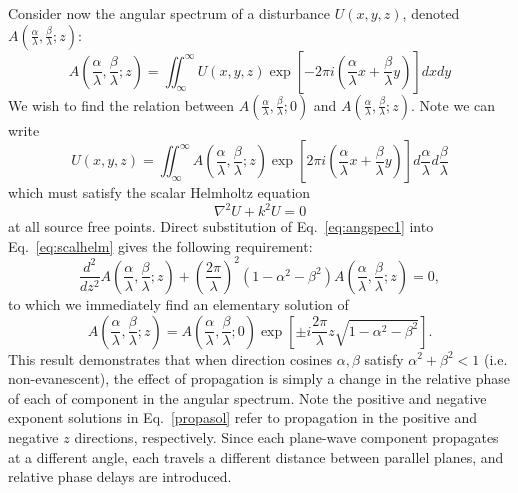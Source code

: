 \documentclass[12pt,a4paper]{article}
\begin{document}
Consider now the angular spectrum of a disturbance \(U(x,y,z)\), denoted \(A\left(\frac{\alpha}{\lambda},\frac{\beta}{\lambda};z\right)\):
\begin{displaymath}
	A\!\left(\frac{\alpha}{\lambda},\frac{\beta}{\lambda};z\right)=\iint_{\infty}^{\infty}U\!\left(x,y,z\right)\exp\left[-2\pi i\left(\frac{\alpha}{\lambda}x+\frac{\beta}{\lambda}y\right)\right]dxdy
\end{displaymath}
We wish to find the relation between \(A\left(\frac{\alpha}{\lambda},\frac{\beta}{\lambda};0\right)\) and \(A\left(\frac{\alpha}{\lambda},\frac{\beta}{\lambda};z\right)\). Note we can write
\begin{equation}
	\label{eq:angspec1}
	U\!\left(x,y,z\right)=\iint_{\infty}^{\infty}A\!\left(\frac{\alpha}{\lambda},\frac{\beta}{\lambda};z\right)\exp\left[2\pi i\left(\frac{\alpha}{\lambda}x+\frac{\beta}{\lambda}y\right)\right]d\frac{\alpha}{\lambda}d\frac{\beta}{\lambda}
\end{equation}
which must satisfy the scalar Helmholtz equation
\begin{equation}
	\label{eq:scalhelm}
	\nabla^{2}U+k^{2}U=0
\end{equation}
at all source free points. Direct substitution of Eq.~\eqref{eq:angspec1} into Eq.~\eqref{eq:scalhelm} gives the following requirement:
\begin{displaymath}
	\frac{d^{2}}{dz^{2}}A\!\left(\frac{\alpha}{\lambda},\frac{\beta}{\lambda};z\right)+\left(\frac{2\pi}{\lambda}\right)^{2}\left(1-\alpha^{2}-\beta^{2}\right)A\!\left(\frac{\alpha}{\lambda},\frac{\beta}{\lambda};z\right)=0,
\end{displaymath}
to which we immediately find an elementary solution of
\begin{equation}
	\label{propasol}
	A\!\left(\frac{\alpha}{\lambda},\frac{\beta}{\lambda};z\right)=A\!\left(\frac{\alpha}{\lambda},\frac{\beta}{\lambda};0\right)\exp\left[\pm i\frac{2\pi}{\lambda}z\sqrt{1-\alpha^{2}-\beta^{2}}\right].
\end{equation}
This result demonstrates that when direction cosines \(\alpha,\beta\) satisfy \(\alpha^{2}+\beta^{2}<1\) (i.e. non-evanescent), the effect of propagation is simply a change in the relative phase of each of component in the angular spectrum. Note the positive and negative exponent solutions in Eq.~\eqref{propasol} refer to propagation in the positive and negative \(z\) directions, respectively. Since each plane-wave component propagates at a different angle, each travels a different distance between parallel planes, and relative phase delays are introduced.
\end{document}
